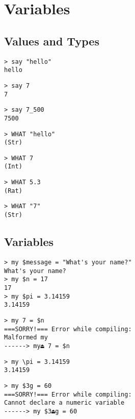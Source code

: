 \chapter{Variables}

\section{Values and Types}

\begin{lstlisting}
> say "hello"
hello
\end{lstlisting}

\begin{lstlisting}
> say 7
7
\end{lstlisting}

\begin{lstlisting}
> say 7_500
7500
\end{lstlisting}

\begin{lstlisting}
> WHAT "hello"
(Str)
\end{lstlisting}

\begin{lstlisting}
> WHAT 7
(Int)
\end{lstlisting}

\begin{lstlisting}
> WHAT 5.3
(Rat)
\end{lstlisting}

\begin{lstlisting}
> WHAT "7"
(Str)
\end{lstlisting}

\section{Variables}

\begin{lstlisting}
> my $message = "What's your name?"
What's your name?
> my $n = 17
17
> my $pi = 3.14159
3.14159
\end{lstlisting}

\begin{lstlisting}
> my 7 = $n
===SORRY!=== Error while compiling:
Malformed my
------> my⏏ 7 = $n
\end{lstlisting}

\begin{lstlisting}
> my \pi = 3.14159
3.14159
\end{lstlisting}

\begin{lstlisting}
> my $3g = 60
===SORRY!=== Error while compiling:
Cannot declare a numeric variable
------> my $3⏏g = 60
\end{lstlisting}

